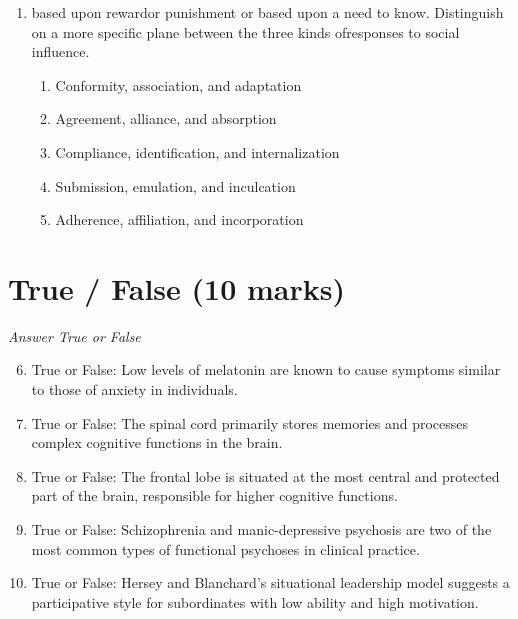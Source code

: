 \documentclass[12pt]{article}
\begin{document}
\begin{enumerate}[label=\arabic*.]
\begin{enumerate}[label=(\alph*)]
    \item gender identity
    \item gender neutrality
    \item gender assimilation
    \item gender fluidity
    \item gender affirmation
\end{enumerate}
\item based upon rewardor punishment or based upon a need to know. Distinguish on a more specific plane between the three kinds ofresponses to social influence.
\begin{enumerate}[label=(\alph*)]
    \item Conformity, association, and adaptation
    \item Agreement, alliance, and absorption
    \item Compliance, identification, and internalization
    \item Submission, emulation, and inculcation
    \item Adherence, affiliation, and incorporation
\end{enumerate}
\end{enumerate}

\section*{True / False (10 marks)}
\textit{Answer True or False}
\begin{enumerate}[label=\arabic*.]
\setcounter{enumi}{5}
\item True or False: Low levels of melatonin are known to cause symptoms similar to those of anxiety in individuals.
\item True or False: The spinal cord primarily stores memories and processes complex cognitive functions in the brain.
\item True or False: The frontal lobe is situated at the most central and protected part of the brain, responsible for higher cognitive functions.
\item True or False: Schizophrenia and manic-depressive psychosis are two of the most common types of functional psychoses in clinical practice.
\item True or False: Hersey and Blanchard's situational leadership model suggests a participative style for subordinates with low ability and high motivation.
\end{enumerate}
\end{document}
